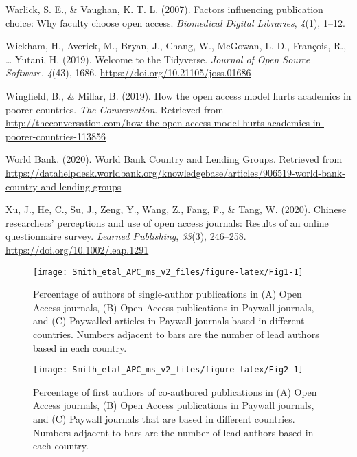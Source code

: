 \documentclass[
  english,
  man]{apa6}
\begin{document}
\leavevmode\hypertarget{ref-warlick_factors_2007}{}%
Warlick, S. E., \& Vaughan, K. T. L. (2007). Factors influencing publication choice: Why faculty choose open access. \emph{Biomedical Digital Libraries}, \emph{4}(1), 1--12.

\leavevmode\hypertarget{ref-wickham_welcome_2019}{}%
Wickham, H., Averick, M., Bryan, J., Chang, W., McGowan, L. D., François, R., \ldots{} Yutani, H. (2019). Welcome to the Tidyverse. \emph{Journal of Open Source Software}, \emph{4}(43), 1686. \url{https://doi.org/10.21105/joss.01686}

\leavevmode\hypertarget{ref-wingfield_how_2019}{}%
Wingfield, B., \& Millar, B. (2019). How the open access model hurts academics in poorer countries. \emph{The Conversation}. Retrieved from \url{http://theconversation.com/how-the-open-access-model-hurts-academics-in-poorer-countries-113856}

\leavevmode\hypertarget{ref-world_bank_world_2020}{}%
World Bank. (2020). World Bank Country and Lending Groups. Retrieved from \url{https://datahelpdesk.worldbank.org/knowledgebase/articles/906519-world-bank-country-and-lending-groups}

\leavevmode\hypertarget{ref-xu_chinese_2020}{}%
Xu, J., He, C., Su, J., Zeng, Y., Wang, Z., Fang, F., \& Tang, W. (2020). Chinese researchers' perceptions and use of open access journals: Results of an online questionnaire survey. \emph{Learned Publishing}, \emph{33}(3), 246--258. \url{https://doi.org/10.1002/leap.1291}

\endgroup

\begin{figure}

{\centering \texttt{[image: Smith\_etal\_APC\_ms\_v2\_files/figure-latex/Fig1-1]} 

}

\caption{Percentage of authors of single-author publications in (A) Open Access journals, (B) Open Access publications in Paywall journals, and (C) Paywalled articles in Paywall journals based in different countries. Numbers adjacent to bars are the number of lead authors based in each country.}\label{fig:Fig1}
\end{figure}

\begin{figure}

{\centering \texttt{[image: Smith\_etal\_APC\_ms\_v2\_files/figure-latex/Fig2-1]} 

}

\caption{Percentage of first authors of co-authored publications in (A) Open Access journals, (B) Open Access publications in Paywall journals, and (C) Paywall journals that are based in different countries. Numbers adjacent to bars are the number of lead authors based in each country.}\label{fig:Fig2}
\end{figure}
\end{document}
